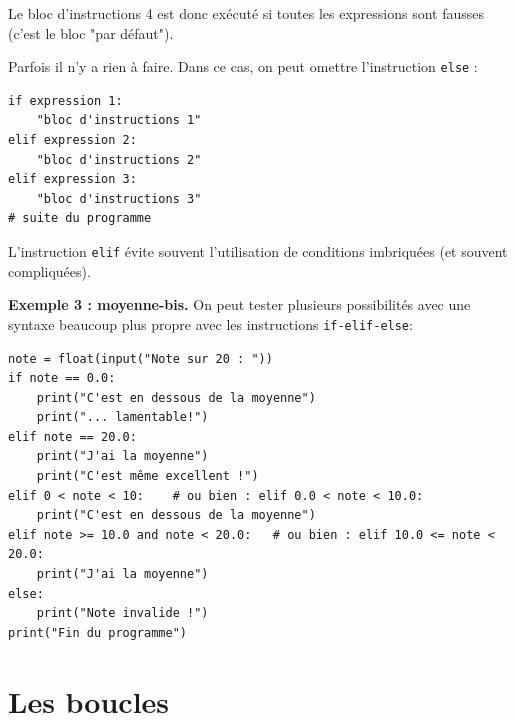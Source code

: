 \documentclass{beamer}
\begin{document}
\begin{frame}

Le bloc d'instructions 4 est donc exécuté si toutes les expressions sont fausses (c'est le bloc "par défaut").

Parfois il n'y a rien à faire. Dans ce cas, on peut omettre l'instruction \texttt{else} :

\begin{verbatim}
if expression 1:
    "bloc d'instructions 1"
elif expression 2:
    "bloc d'instructions 2"
elif expression 3:
    "bloc d'instructions 3"
# suite du programme
\end{verbatim}
\end{frame}

\begin{frame}

L'instruction \texttt{elif} évite souvent l'utilisation de conditions imbriquées (et souvent compliquées).

\noindent\textbf{Exemple 3 : moyenne-bis.}
On peut tester plusieurs possibilités avec une syntaxe beaucoup plus propre avec les instructions \texttt{if-elif-else}:
\begin{verbatim}
note = float(input("Note sur 20 : "))
if note == 0.0:
    print("C'est en dessous de la moyenne")
    print("... lamentable!")
elif note == 20.0:
    print("J'ai la moyenne")
    print("C'est même excellent !")
elif 0 < note < 10:    # ou bien : elif 0.0 < note < 10.0:
    print("C'est en dessous de la moyenne")
elif note >= 10.0 and note < 20.0:   # ou bien : elif 10.0 <= note < 20.0:
    print("J'ai la moyenne")
else:
    print("Note invalide !")
print("Fin du programme")
\end{verbatim}
\end{frame}

\section{Les boucles}
\end{document}
